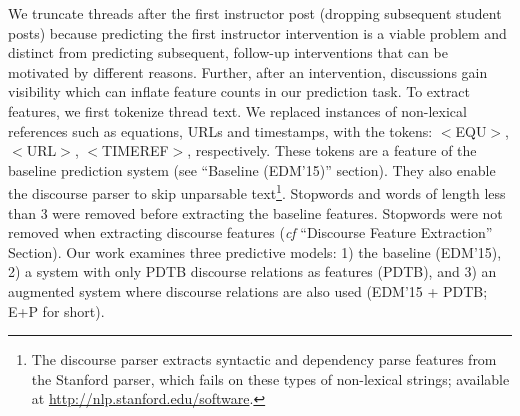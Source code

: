\documentclass[letterpaper]{article}
\begin{document}
We truncate threads after the first instructor post (dropping
subsequent student posts) %
because predicting
the first instructor intervention is a viable problem and distinct
from predicting subsequent, follow-up interventions that can be
motivated by different reasons.  Further, after an intervention,
discussions gain visibility which can
inflate feature counts in our prediction task. To extract features, we
first tokenize thread text.  We replaced instances of non-lexical
references such as equations, URLs and timestamps, with the tokens:
$<$EQU$>$, $<$URL$>$, $<$TIMEREF$>$, respectively. These tokens are a
feature of the baseline prediction system (see ``Baseline (EDM'15)''
section). They also enable the discourse parser to skip unparsable
text\footnote{The discourse parser extracts syntactic and dependency
  parse features from the Stanford parser, which fails on these types
  of non-lexical strings; available at
  \url{http://nlp.stanford.edu/software}.}. Stopwords and words of
length less than 3 were removed before extracting the baseline
features. Stopwords were not removed when extracting discourse
features ({\it cf} ``Discourse Feature Extraction'' Section).
Our work examines three predictive models: 1) the baseline (EDM'15),
2) a system with only PDTB discourse relations as features (PDTB), and
3) an augmented system where discourse relations are also used (EDM'15
+ PDTB; E+P for short).
\end{document}
